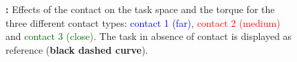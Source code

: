 	\begin{figure}[t]
		\caption{\textbf{:} Effects of the contact on the task space and the torque for the three different contact types: \textcolor{blue}{contact 1 (far)}, \textcolor{red}{contact 2 (medium)} and \textcolor{darkgreen}{contact 3 (close)}. 
		The task in absence of contact is displayed as reference (\textbf{black dashed curve}). 
		}
		\label{fig:exp2:effects_contact}
        \figspace
	\end{figure}
	
